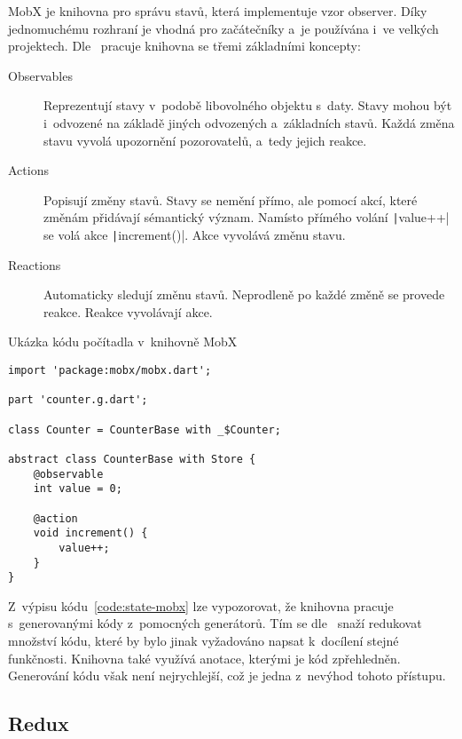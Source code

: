 MobX je knihovna pro správu stavů,
která implementuje vzor observer.
Díky jednomuchému rozhraní je vhodná pro začátečníky
a~je používána i~ve velkých projektech.
Dle~\cite{mobx_core_concepts} pracuje knihovna se třemi základními koncepty:

\begin{description}
    \item[Observables] Reprezentují stavy v~podobě libovolného objektu s~daty.
    Stavy mohou být i~odvozené na základě jiných odvozených a~základních stavů.
    Každá změna stavu vyvolá upozornění pozorovatelů, a~tedy jejich reakce.
    \item[Actions] Popisují změny stavů.
    Stavy se nemění přímo,
    ale pomocí akcí,
    které změnám přidávají sémantický význam.
    Namísto přímého volání \texttt|value++| se volá akce
    \texttt|increment()|.
    Akce vyvolává změnu stavu.
    \item[Reactions] Automaticky sledují změnu stavů.
    Neprodleně po každé změně se provede reakce.
    Reakce vyvolávají akce.
\end{description}

\begin{listing}
    \caption{Ukázka kódu počítadla v~knihovně MobX~\cite{mobx_core_concepts}}
    \label{code:state-mobx}
    \begin{verbatim}
import 'package:mobx/mobx.dart';

part 'counter.g.dart';

class Counter = CounterBase with _$Counter;

abstract class CounterBase with Store {
    @observable
    int value = 0;

    @action
    void increment() {
        value++;
    }
}
    \end{verbatim}
\end{listing}

Z~výpisu kódu~\ref{code:state-mobx} lze vypozorovat,
že knihovna pracuje s~generovanými kódy z~pomocných generátorů.
Tím se dle~\cite{mobx_core_concepts} snaží redukovat množství kódu,
které by bylo jinak vyžadováno napsat k~docílení stejné funkčnosti.
Knihovna také využívá anotace,
kterými je kód zpřehledněn.
Generování kódu však není nejrychlejší,
což je jedna z~nevýhod tohoto přístupu.

\pagebreak
\subsection{Redux}

